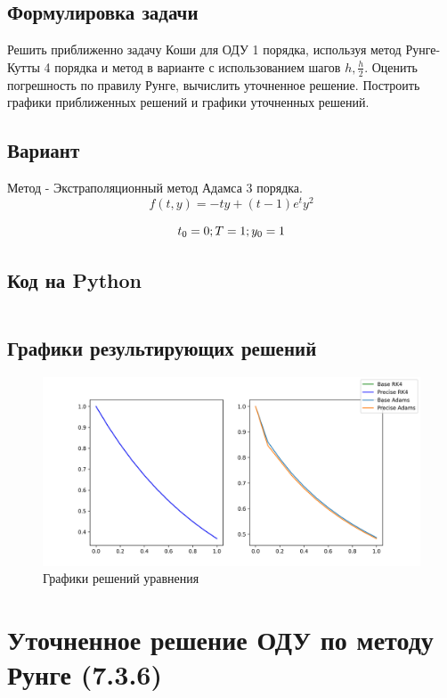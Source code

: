 \documentclass[a4paper,12pt]{article}
\newenvironment{longlisting}{\captionsetup{type=listing}}{}
\begin{document}
\subsection{Формулировка задачи}
Решить приближенно задачу Коши для ОДУ 1 порядка, используя метод Рунге-Кутты 4 порядка и метод в варианте с использованием шагов $h, \frac{h}{2}$. Оценить погрешность по правилу Рунге, вычислить уточненное решение. Построить графики приближенных решений и графики уточненных решений.

\subsection{Вариант}
Метод - Экстраполяционный метод Адамса 3 порядка.
$$ f(t, y) = -ty + (t-1) e^t y^2 $$

$$ t_0 = 0; \space T = 1; \space y_0 = 1 $$

\subsection{Код на Python}

\begin{longlisting}
	\inputminted{python}{src/adams_vs_rk.py}
\end{longlisting}

\subsection{Графики результирующих решений}
\begin{figure}[H]
	\centering
	\includegraphics[width=\linewidth]{plots/adams_vs_rk.png}
	\caption{Графики решений уравнения}
	\label{fig:adams_rk}
\end{figure}

\section{Уточненное решение ОДУ по методу Рунге (7.3.6)}
\end{document}
